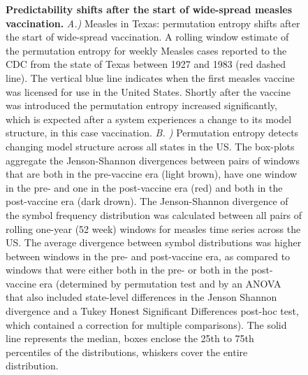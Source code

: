 \documentclass[fleqn,12pt]{wlscirep}
\begin{document}
\begin{figure}[H]
	\centering
	\caption{\label{fig:vaccent}
		\textbf{Predictability shifts after the start of wide-spread measles vaccination.} \textit{A.)} Measles in Texas: permutation entropy shifts after the start of wide-spread vaccination. A rolling window estimate of the permutation entropy for weekly Measles cases reported to the CDC from the state of Texas between 1927 and 1983 (red dashed line).  The vertical blue line indicates when the first measles vaccine was licensed for use in the United States.  Shortly after the vaccine was introduced the permutation entropy increased significantly, which is expected after a system experiences a change to its model structure, in this case vaccination.
		\textit{B. )} Permutation entropy detects changing model structure across all states in the US. The box-plots aggregate the Jenson-Shannon divergences between pairs of windows that are both in the pre-vaccine era (light brown), have one window in the pre- and one in the post-vaccine era (red) and both in the post-vaccine era (dark drown). The Jenson-Shannon divergence of the symbol frequency distribution was calculated between all pairs of rolling one-year (52 week) windows for measles time series across the US. The average divergence between symbol distributions was higher between windows in the pre- and post-vaccine era, as compared to windows that were either both in the pre- or both in the post-vaccine era (determined by permutation test and by an ANOVA that also included state-level differences in the Jenson Shannon divergence and a Tukey Honest Significant Differences post-hoc test, which contained a correction for multiple comparisons). The solid line represents the median, boxes enclose the 25th to 75th percentiles of the distributions, whiskers cover the entire distribution. 
	}
\end{figure}


\end{document}
